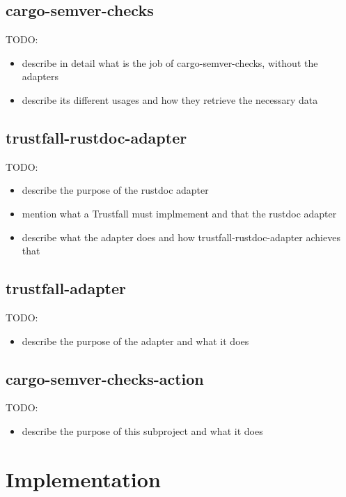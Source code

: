 \documentclass[licencjacka,en]{pracamgr}
\begin{document}
\section{cargo-semver-checks}

TODO:
\begin{itemize}
	\item describe in detail what is the job of cargo-semver-checks, without the adapters
	\item describe its different usages and how they retrieve the necessary data
\end{itemize}

\section{trustfall-rustdoc-adapter}

TODO:
\begin{itemize}
	\item describe the purpose of the rustdoc adapter
	\item mention what a Trustfall must implmement and that the rustdoc adapter
	\item describe what the adapter does and how trustfall-rustdoc-adapter achieves that
\end{itemize}

\section{trustfall-adapter}

TODO:
\begin{itemize}
	\item describe the purpose of the adapter and what it does
\end{itemize}

\section{cargo-semver-checks-action}

TODO:
\begin{itemize}
	\item describe the purpose of this subproject and what it does
\end{itemize}


\chapter{Implementation}\label{r:chapter_implementation}
\end{document}
